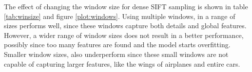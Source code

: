 The effect of changing the window size for dense SIFT sampling is shown in table \ref{tab:winsize} and figure \ref{plot:windows}. Using multiple windows, in a range of sizes performs well, since these windows capture both details and global features. However, a wider range of window sizes does not result in a better performance, possibly since too many features are found and the model starts overfitting. Smaller window sizes, also underperform since these small windows are not capable of capturing larger features, like the wings of airplanes and entire cars. 
